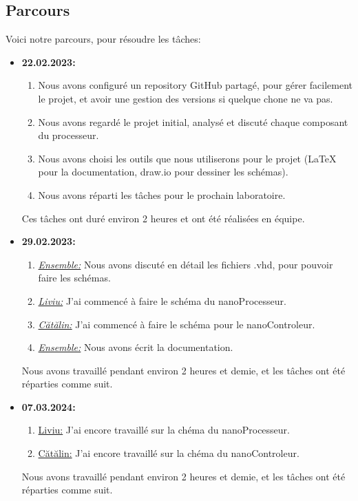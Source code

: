 \documentclass{article}
\begin{document}
    \subsection{Parcours}
    Voici notre parcours, pour résoudre les tâches:
    \begin{itemize}
        \item \textbf{22.02.2023:}
        \begin{enumerate}
            \item Nous avons configuré un repository GitHub partagé, pour gérer facilement le projet, et avoir une gestion des versions si quelque chone ne va pas.
            \item Nous avons regardé le projet initial, analysé et discuté chaque composant du processeur.
            \item Nous avons choisi les outils que nous utiliserons pour le projet (LaTeX pour la documentation, draw.io pour dessiner les schémas).
            \item Nous avons réparti les tâches pour le prochain laboratoire.
        \end{enumerate}
        Ces tâches ont duré environ 2 heures et ont été réalisées en équipe.
        \item \textbf{29.02.2023:}
        \begin{enumerate}
            \item \textit{\underline{Ensemble:}} Nous avons discuté en détail les fichiers .vhd, pour pouvoir faire les schémas.
            \item \textit{\underline{Liviu:}} J'ai commencé à faire le schéma du nanoProcesseur.
            \item \textit{\underline{Cătălin:}} J'ai commencé à faire le schéma pour le nanoControleur.
            \item \textit{\underline{Ensemble:}} Nous avons écrit la documentation.
        \end{enumerate}
        Nous avons travaillé pendant environ 2 heures et demie, et les tâches ont été réparties comme suit.
        \item \textbf{07.03.2024:}
        \begin{enumerate}
            \item \underline{Liviu:} J'ai encore travaillé sur la chéma du nanoProcesseur.
            \item \underline{Cătălin:} J'ai encore travaillé sur la chéma du nanoControleur.
        \end{enumerate}
        Nous avons travaillé pendant environ 2 heures et demie, et les tâches ont été réparties comme suit.
    \end{itemize}
\end{document}
